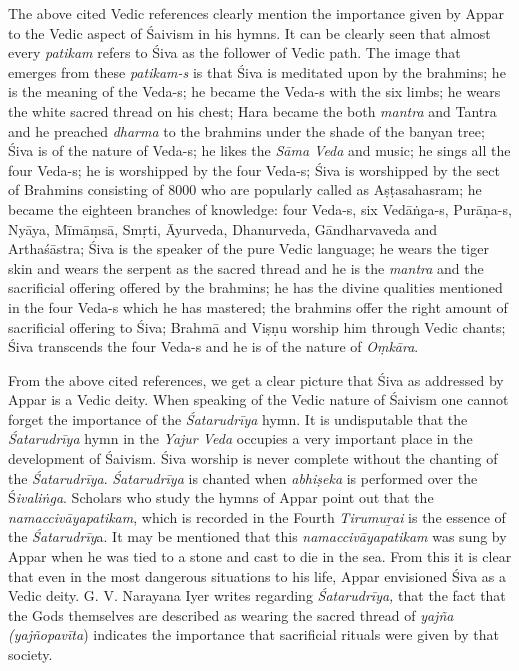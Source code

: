 \newpage

The above cited Vedic references clearly mention the importance given by Appar to the Vedic aspect of Śaivism in his hymns. It can be clearly seen that almost every \textit{patikam} refers to Śiva as the follower of Vedic path. The image that emerges from these \textit{patikam-s} is that Śiva is meditated upon by the brahmins; he is the meaning of the Veda-s; he became the Veda-s with the six limbs; he wears the white sacred thread on his chest; Hara became the both \textit{mantra} and Tantra and he preached \textit{dharma} to the brahmins under the shade of the banyan tree; Śiva is of the nature of Veda-s; he likes the \textit{Sāma Veda} and music; he sings all the four Veda-s; he is worshipped by the four Veda-s; Śiva is worshipped by the sect of Brahmins consisting of 8000 who are popularly called as Aṣṭasahasram; he became the eighteen branches of knowledge: four Veda-s, six Vedāṅga-s, Purāṇa-s, Nyāya, Mīmāṃsā, Smṛti, Āyurveda, Dhanurveda, Gāndharvaveda and Arthaśāstra; Śiva is the speaker of the pure Vedic language; he wears the tiger skin and wears the serpent as the sacred thread and he is the \textit{mantra} and the sacrificial offering offered by the brahmins; he has the divine qualities mentioned in the four Veda-s which he has mastered; the brahmins offer the right amount of sacrificial offering to Śiva; Brahmā and Viṣṇu worship him through Vedic chants; Śiva transcends the four Veda-s and he is of the nature of \textit{Oṃkāra}.

From the above cited references, we get a clear picture that Śiva as addressed by Appar is a Vedic deity. When speaking of the Vedic nature of Śaivism one cannot forget the importance of the \textit{Śatarudrīya} hymn. It is undisputable that the \textit{Śatarudrīya} hymn in the \textit{Yajur Veda} occupies a very important place in the development of Śaivism. Śiva worship is never complete without the chanting of the \textit{Śatarudrīya}. \textit{Śatarudrīya} is chanted when \textit{abhiṣeka }is performed over the Ś\textit{ivaliṅga}. Scholars who study the hymns of Appar point out that the \textit{namaccivāyapatikam}, which is recorded in the Fourth \textit{Tirumuṟai} is the essence of the \textit{Śatarudrīy}a. It may be mentioned that this \textit{namaccivāyapatikam }was sung by Appar when he was tied to a stone and cast to die in the sea. From this it is clear that even in the most dangerous situations to his life, Appar envisioned Śiva as a Vedic deity. G. V. Narayana Iyer writes regarding \textit{Śatarudrīya,} that the fact that the Gods themselves are described as wearing the sacred thread of \textit{yajña (yajñopavīta}) indicates the importance that sacrificial rituals were given by that society.


